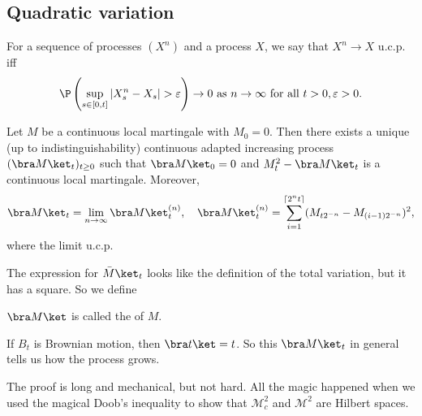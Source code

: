 \documentclass[a4paper]{article}
\begin{document}
\subsection{Quadratic variation}
\begin{defi}
  For a sequence of processes $(X^n)$ and a process $X$, we say that $X^n \to X$ u.c.p. iff
  \[
    \P\left(\sup_{s \in [0, t]} |X_s^n - X_s| > \varepsilon\right) \to 0\text{ as }n \to \infty\text{ for all }t > 0, \varepsilon > 0.
  \]
\end{defi}

\begin{thm}
  Let $M$ be a continuous local martingale with $M_0 = 0$. Then there exists a unique (up to indistinguishability) continuous adapted increasing process $(\bra M\ket_t)_{t \geq 0}$ such that $\bra M\ket_0 = 0$ and $M_t^2 - \bra M\ket_t$ is a continuous local martingale. Moreover,
  \[
    \bra M \ket_t = \lim_{n \to \infty} \bra M\ket_t^{(n)},\quad \bra M\ket_t^{(n)} = \sum_{i = 1}^{\lceil 2^n t\rceil} (M_{t 2^{-n}} - M_{(i - 1)2^{-n}})^2,
  \]
  where the limit u.c.p.
\end{thm}
The expression for $\bar M\ket_t$ looks like the definition of the total variation, but it has a square. So we define
\begin{defi}
  $\bra M\ket$ is called the  of $M$.
\end{defi}
If $B_t$ is Brownian motion, then $\bra t \ket = t$. So this $\bra M\ket_t$ in general tells us how the process grows.

The proof is long and mechanical, but not hard. All the magic happened when we used the magical Doob's inequality to show that $\mathcal{M}_c^2$ and $\mathcal{M}^2$ are Hilbert spaces.
\end{document}
